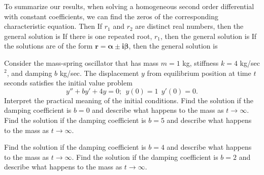 To summarize our results, when solving a homogeneous second order differential with constant coefficients, we can find the zeros of the corresponding characteristic equation. Then 
\bi
\ii If $r_1$ and $r_2$ are distinct real numbers, then the general solution is
\vspace{0.65in}
\ii If there is one repeated root, $r_1$, then the general solution is
\vspace{0.65in}
\ii If the solutions are of the form $\mathbf{r = \alpha \pm i \beta}$, then the general solution is
\vspace{0.65in}
\ei

\clearpage





\bb[resume]

\ii %
Consider the mass-spring oscillator that has mass $m=1$ kg, stiffness $k=4$ kg/sec$^2$, and
damping $b$ kg/sec. The displacement $y$ from equilibrium position at time $t$ seconds 
satisfies the initial value problem
\[ y''+by'+4y=0; \ \ y(0)=1 \ \ y'(0)=0.\]
\bb
\ii Interpret the practical meaning of the initial conditions. \vfill 
\ii Find the solution if the damping coefficient is $b=0$ and describe what happens to the mass as $t \to \infty$. \vfill
\ii Find the solution if the damping coefficient is $b=5$ and describe what happens to the mass as $t \to \infty$. \vfill
    
\clearpage

\ii Find the solution if the damping coefficient is $b=4$ and describe what happens to the mass as $t \to \infty$. \vfill
\ii Find the solution if the damping coefficient is $b=2$ and describe what happens to the mass as $t \to \infty$. \vfill
\ee
\ee




